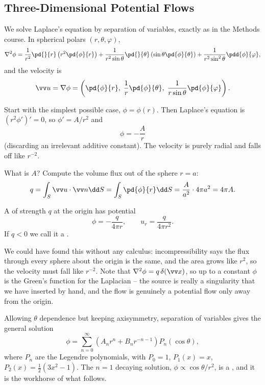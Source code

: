 \subsection{Three-Dimensional Potential Flows}

We solve Laplace's equation by separation of variables, exactly as in the Methods course. In spherical polars $(r, \theta, \varphi)$,
$$
\nabla^2 \phi = \frac{1}{r^2}\pd{}{r}\left(r^2 \pd{\phi}{r}\right) + \frac{1}{r^2\sin\theta}\pd{}{\theta}\left(\sin\theta \pd{\phi}{\theta}\right) + \frac{1}{r^2\sin^2\theta}\pdd{\phi}{\varphi},
$$
and the velocity is
$$
\vv u = \nabla \phi = \left(\pd{\phi}{r}, \; \frac{1}{r}\pd{\phi}{\theta}, \; \frac{1}{r\sin\theta}\pd{\phi}{\varphi}\right).
$$

Start with the simplest possible case, $\phi = \phi(r)$. Then Laplace's equation is $(r^2 \phi')' = 0$, so $\phi' = A/r^2$ and
$$
\phi = -\frac{A}{r}
$$
(discarding an irrelevant additive constant). The velocity is purely radial and falls off like $r^{-2}$.

What is $A$? Compute the volume flux out of the sphere $r = a$:
$$
q = \int_S \vv u \cdot \vv n \dd S = \int_S \pd{\phi}{r}\dd S = \frac{A}{a^2}\cdot 4\pi a^2 = 4\pi A.
$$

\begin{definition}
	A  of strength $q$ at the origin has potential
	$$
	\phi = -\frac{q}{4\pi r}, \qquad u_r = \frac{q}{4\pi r^2}.
	$$
	If $q < 0$ we call it a .
\end{definition}

We could have found this without any calculus: incompressibility says the flux through every sphere about the origin is the same, and the area grows like $r^2$, so the velocity must fall like $r^{-2}$. Note that $\nabla^2\phi = q\,\delta(\vv x)$, so up to a constant $\phi$ is the Green's function for the Laplacian -- the source is really a singularity that we have inserted by hand, and the flow is genuinely a potential flow only away from the origin.

Allowing $\theta$ dependence but keeping axisymmetry, separation of variables gives the general solution
$$
\phi = \sum_{n=0}^\infty \left(A_n r^n + B_n r^{-n-1}\right) P_n(\cos\theta),
$$
where $P_n$ are the Legendre polynomials, with $P_0 = 1$, $P_1(x) = x$, $P_2(x) = \tfrac{1}{2}(3x^2 - 1)$. The $n = 1$ decaying solution, $\phi \propto \cos\theta/r^2$, is a , and it is the workhorse of what follows.


